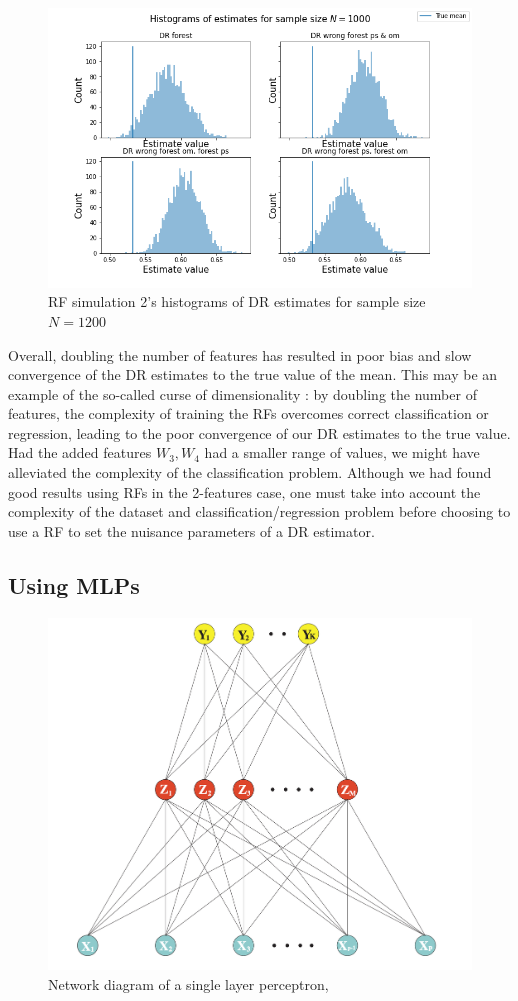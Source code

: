 \documentclass[12pt,twoside]{article}
\begin{document}
\begin{figure}[h!]
    \centering
    \includegraphics[width = 0.9\columnwidth]{figures/histRF_moreW.png}
    \caption{RF simulation 2's histograms of DR estimates for sample size $N = 1200$}
    \label{fighistRF_moreW}
\end{figure}

Overall, doubling the number of features has resulted in poor bias and slow convergence of the DR estimates to the true value of the mean. This may be an example of the so-called curse of dimensionality \citep{Wasserman2006}: by doubling the number of features, the complexity of training the RFs overcomes correct classification or regression, leading to the poor convergence of our DR estimates to the true value. Had the added features $W_3,W_4$ had a smaller range of values, we might have alleviated the complexity of the classification problem. Although we had found good results using RFs in the 2-features case, one must take into account the complexity of the dataset and classification/regression problem before choosing to use a RF to set the nuisance parameters of a DR estimator.

\clearpage
\subsection{Using MLPs}
\begin{figure}[h!]
    \centering
    \includegraphics[width = 0.7\columnwidth]{figures/Screenshot 2021-05-26 at 19.21.43.png}
    \caption{Network diagram of a single layer perceptron, \citet{hastieESL}}
    \label{fignn}
\end{figure}
\end{document}
